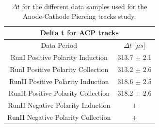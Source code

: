 \begin{center}
\begin{table}[htb]
  \begin{center}
    \begin{tabular}{|c|c|}
      \multicolumn{2}{c}{\textbf{Delta t for ACP tracks}} \\
      \hline \hline
       Data Period  & $\Delta t$ [$\mu s$] \\
       \hline
       RunI Positive Polarity Induction & 313.7 $\pm$ 2.1 \\
       \hline
       RunI Positive Polarity Collection & 313.2 $\pm$ 2.6 \\
       \hline
       RunII Positive Polarity Induction &  318.6 $\pm$ 2.5\\
       \hline
       RunII Positive Polarity Collection & 318.2 $\pm$ 2.6 \\
       \hline
       RunII Negative Polarity Induction &  $\pm$ \\
       \hline
       RunII Negative Polarity Collection & $\pm$ \\
       \hline
       \end{tabular}
    \caption{$\Delta t$ for the different data samples used for the Anode-Cathode Piercing tracks study. }
    \label{tab:deltaTACP}
    \end{center}
\end{table}
\end{center}


